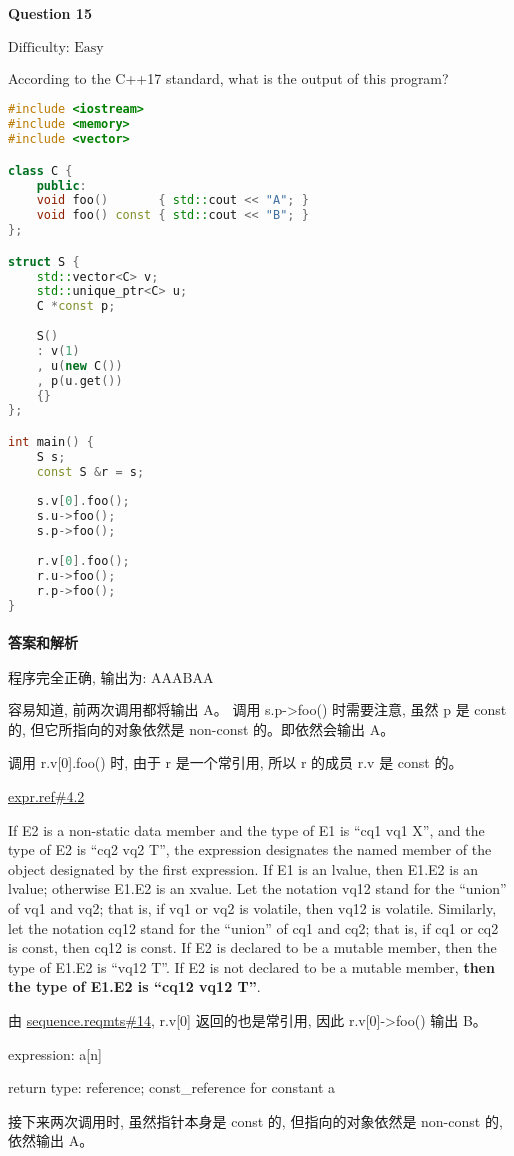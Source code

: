 \documentclass{article}
\begin{document}
	\paragraph*{Question 15} $\boxed{\text{Difficulty: Easy}} $			
	
	According to the C++17 standard, what is the output of this program?
	
	\begin{lstlisting}[language=C++]  		
#include <iostream>
#include <memory>
#include <vector>

class C {
	public:
	void foo()       { std::cout << "A"; }
	void foo() const { std::cout << "B"; }
};

struct S {
	std::vector<C> v;
	std::unique_ptr<C> u;
	C *const p;
	
	S() 
	: v(1) 
	, u(new C())
	, p(u.get())
	{}
};

int main() {
	S s;
	const S &r = s;
	
	s.v[0].foo();
	s.u->foo();
	s.p->foo();
	
	r.v[0].foo();
	r.u->foo();
	r.p->foo();
}
	\end{lstlisting}
	
	
	\paragraph*{答案和解析} $\boxed{\text{程序完全正确, 输出为: AAABAA}} $
	
	容易知道, 前两次调用都将输出 A。
	调用 s.p->foo() 时需要注意, 虽然 p 是 const 的, 但它所指向的对象依然是 non-const 的。即依然会输出 A。

	调用 r.v[0].foo() 时, 由于 r 是一个常引用, 所以 r 的成员 r.v 是 const 的。
	
	\href{https://timsong-cpp.github.io/cppwp/n4659/expr.ref#4.2}{expr.ref\#4.2}
	
	\begin{lightgrayleftbar}
		If E2 is a non-static data member and the type of E1 is “cq1 vq1 X”, and the type of E2 is “cq2 vq2 T”, the expression designates the named member of the object designated by the first expression. If E1 is an lvalue, then E1.E2 is an lvalue; otherwise E1.E2 is an xvalue. Let the notation vq12 stand for the “union” of vq1 and vq2; that is, if vq1 or vq2 is volatile, then vq12 is volatile. Similarly, let the notation cq12 stand for the “union” of cq1 and cq2; that is, if cq1 or cq2 is const, then cq12 is const. If E2 is declared to be a mutable member, then the type of E1.E2 is “vq12 T”. If E2 is not declared to be a mutable member, \textbf{then the type of E1.E2 is “cq12 vq12 T”}.
	\end{lightgrayleftbar}
	
	由 \href{https://timsong-cpp.github.io/cppwp/n4659/sequence.reqmts#14}{sequence.reqmts\#14}, r.v[0] 返回的也是常引用, 因此 r.v[0]->foo() 输出 B。
	
	\begin{lightgrayleftbar}
		expression: a[n] 	
		
		return type: reference; const\_­reference for constant a
	\end{lightgrayleftbar}
	
	接下来两次调用时, 虽然指针本身是 const 的, 但指向的对象依然是 non-const 的, 依然输出 A。
	
\end{document}
